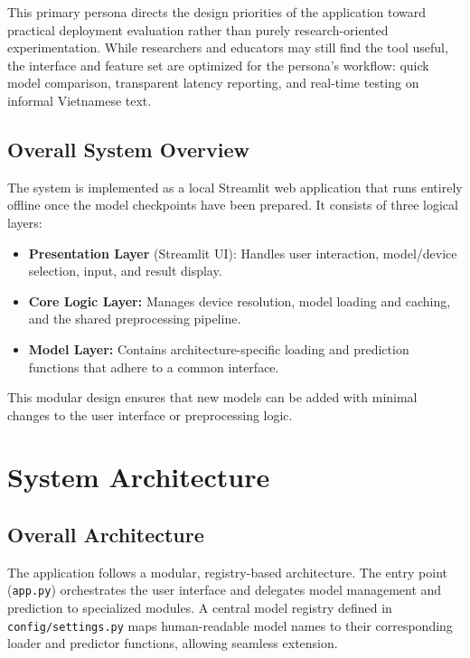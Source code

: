 \documentclass[12pt]{report} %
\begin{document}
This primary persona directs the design priorities of the application toward practical deployment evaluation rather than purely research-oriented experimentation. While researchers and educators may still find the tool useful, the interface and feature set are optimized for the persona's workflow: quick model comparison, transparent latency reporting, and real-time testing on informal Vietnamese text.

\subsection{Overall System Overview}

The system is implemented as a local Streamlit web application \cite{streamlit2024} that runs entirely offline once the model checkpoints have been prepared. It consists of three logical layers:
\begin{itemize}
    \item \textbf{Presentation Layer} (Streamlit UI): Handles user interaction, model/device selection, input, and result display.
    \item \textbf{Core Logic Layer:} Manages device resolution, model loading and caching, and the shared preprocessing pipeline.
    \item \textbf{Model Layer:} Contains architecture-specific loading and prediction functions that adhere to a common interface.
\end{itemize}

This modular design ensures that new models can be added with minimal changes to the user interface or preprocessing logic.

\section{System Architecture}
\label{sec:system-architecture}

\subsection{Overall Architecture}

The application follows a modular, registry-based architecture. The entry point (\texttt{app.py}) orchestrates the user interface and delegates model management and prediction to specialized modules. A central model registry defined in \texttt{config/settings.py} maps human-readable model names to their corresponding loader and predictor functions, allowing seamless extension.
\end{document}
